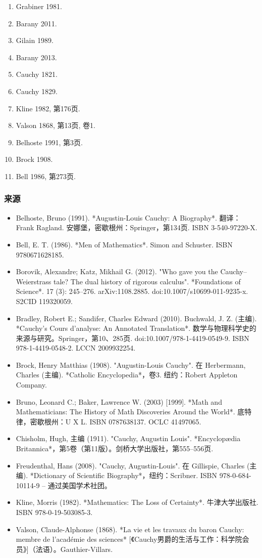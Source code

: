 \begin{enumerate}
\item Grabiner 1981.
\item Barany 2011.
\item Gilain 1989.
\item Barany 2013.
\item Cauchy 1821.
\item Cauchy 1829.
\item Kline 1982, 第176页.
\item Valson 1868, 第13页, 卷1.
\item Belhoste 1991, 第3页.
\item Brock 1908.
\item Bell 1986, 第273页.
\end{enumerate}
\subsubsection{来源}
\begin{itemize}
\item Belhoste, Bruno (1991). *Augustin-Louis Cauchy: A Biography*. 翻译：Frank Ragland. 安娜堡，密歇根州：Springer，第134页. ISBN 3-540-97220-X.
\item Bell, E. T. (1986). *Men of Mathematics*. Simon and Schuster. ISBN 9780671628185.
\item Borovik, Alexandre; Katz, Mikhail G. (2012). "Who gave you the Cauchy–Weierstrass tale? The dual history of rigorous calculus". *Foundations of Science*. 17 (3): 245–276. arXiv:1108.2885. doi:10.1007/s10699-011-9235-x. S2CID 119320059.
\item Bradley, Robert E.; Sandifer, Charles Edward (2010). Buchwald, J. Z. (主编). *Cauchy's Cours d'analyse: An Annotated Translation*. 数学与物理科学史的来源与研究。Springer，第10、285页. doi:10.1007/978-1-4419-0549-9. ISBN 978-1-4419-0548-2. LCCN 2009932254.
\item Brock, Henry Matthias (1908). "Augustin-Louis Cauchy". 在 Herbermann, Charles (主编). *Catholic Encyclopedia*，卷3. 纽约：Robert Appleton Company.
\item Bruno, Leonard C.; Baker, Lawrence W. (2003) [1999]. *Math and Mathematicians: The History of Math Discoveries Around the World*. 底特律，密歇根州：U X L. ISBN 0787638137. OCLC 41497065.
\item Chisholm, Hugh, 主编 (1911). "Cauchy, Augustin Louis". *Encyclopædia Britannica*，第5卷（第11版）。剑桥大学出版社，第555–556页.
\item Freudenthal, Hans (2008). "Cauchy, Augustin-Louis". 在 Gillispie, Charles (主编). *Dictionary of Scientific Biography*，纽约：Scribner. ISBN 978-0-684-10114-9 – 通过美国学术社团。
\item Kline, Morris (1982). *Mathematics: The Loss of Certainty*. 牛津大学出版社. ISBN 978-0-19-503085-3.
\item Valson, Claude-Alphonse (1868). *La vie et les travaux du baron Cauchy: membre de l'académie des sciences* [《Cauchy男爵的生活与工作：科学院会员》]（法语）。Gauthier-Villars.
\end{itemize}
